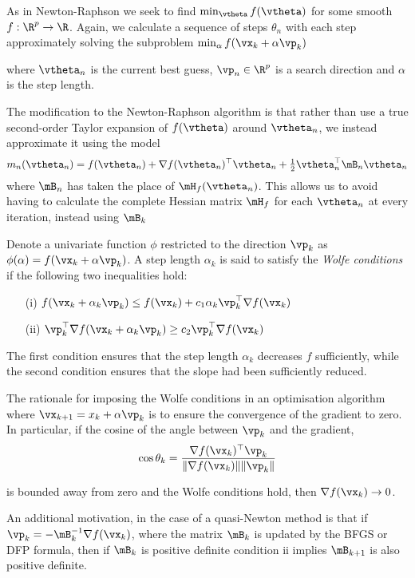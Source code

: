 
As in Newton-Raphson we seek to find $\min_\vtheta f(\vtheta)$ for some smooth $f: \R^p \to \R$.  Again, we
calculate a sequence of steps $\theta_n$ with each step approximately solving the subproblem $\min_\alpha
f(\vx_k + \alpha \vp_k)$

where $\vtheta_n$ is the current best guess, $\vp_n \in \R^p$ is a search direction and $\alpha$ is the
step length.

The modification to the Newton-Raphson algorithm is that rather than use a true second-order Taylor expansion
of $f(\vtheta)$ around $\vtheta_n$, we instead approximate it using the model
\[
	m_n(\vtheta_n) = f(\vtheta_n) + \nabla f(\vtheta_n)^\top \vtheta_n + \tfrac{1}{2} \vtheta_n^\top \mB_n \vtheta_n
\]
where $\mB_n$ has taken the place of $\mH_f(\vtheta_n)$. This allows us to avoid having to calculate the complete 
Hessian matrix $\mH_f$ for each $\vtheta_n$ at every iteration, instead using $\mB_k$ %

Denote a univariate function $\phi$ restricted to the direction $\vp_k$ as
$\phi(\alpha) = f(\vx_k + \alpha \vp_k)$. A step length $\alpha_k$ is said to satisfy the \emph{Wolfe conditions}
if the following two inequalities hold:

\begin{enumerate}
	\item[(i)] $f(\vx_k + \alpha_k \vp_k) \leq f(\vx_k) + c_1 \alpha_k \vp_k^\top \nabla f(\vx_k)$ 
	\item[(ii)] $\vp_k^\top \nabla f(\vx_k + \alpha_k \vp_k) \geq c_2 \vp_k^\top \nabla f(\vx_k)$ 
\end{enumerate}

The first condition ensures that the step length $\alpha_k$ decreases $f$ sufficiently, while the second condition
ensures that the slope had been sufficiently reduced.

The rationale for imposing the Wolfe conditions in an optimisation algorithm where
$\vx_{k+1} = x_k + \alpha \vp_k$ is to ensure the convergence of the gradient to zero. In particular, if the
cosine of the angle between $\vp_k$ and the gradient,
$$
\cos \theta_k = \frac{\nabla f(\vx_k)^\top \vp_k}{\|\nabla f(\vx_k)\| \|\vp_k\|}
$$

is bounded away from zero and the Wolfe conditions hold, then $\nabla f(\vx_k) \to 0$.

An additional motivation, in the case of a quasi-Newton method is that if $\vp_k = - \mB_k^{-1} \nabla f(\vx_k)$,
where the matrix $\mB_k$ is updated by the BFGS or DFP formula, then if $\mB_k$ is positive definite condition ii
implies $\mB_{k+1}$ is also positive definite.

